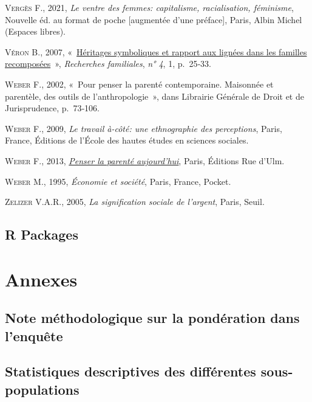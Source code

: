 \documentclass[
  12pt,
]{book}
\newlength{\cslhangindent}
\newenvironment{CSLReferences}[2] %
 {\begin{list}{}{%
  \setlength{\itemindent}{0pt}
  \setlength{\leftmargin}{0pt}
  \setlength{\parsep}{0pt}
  \ifodd #1
   \setlength{\leftmargin}{\cslhangindent}
   \setlength{\itemindent}{-1\cslhangindent}
  \fi
  \setlength{\itemsep}{#2\baselineskip}}}
 {\end{list}}
\begin{document}
\begin{CSLReferences}{0}{1}
\textsc{Vergès F.}, 2021, \emph{Le ventre des femmes: capitalisme,
racialisation, féminisme}, Nouvelle éd. au format de poche {[}augmentée
d'une préface{]}, Paris, Albin Michel (Espaces libres).

\textsc{Véron B.}, 2007,
{«~\href{http://www.cairn.info/revue-recherches-familiales-2007-1-page-25.htm}{Héritages
symboliques et rapport aux lignées dans les familles recomposées}~»},
\emph{Recherches familiales}, \emph{n° 4}, 1, p.~25‑33.

\textsc{Weber F.}, 2002, {«~Pour penser la parenté contemporaine.
Maisonnée et parentèle, des outils de l{'}anthropologie~»}, dans
Librairie Générale de Droit et de Jurisprudence, p.~73‑106.

\textsc{Weber F.}, 2009, \emph{Le travail à-côté: une ethnographie des
perceptions}, Paris, France, Éditions de l'École des hautes études en
sciences sociales.

\textsc{Weber F.}, 2013,
\emph{\href{http://www.cairn.info/penser-la-parente-aujourd-hui--9782728805013.htm}{Penser
la parenté aujourd'hui}}, Paris, Éditions Rue d'Ulm.

\textsc{Weber M.}, 1995, \emph{Économie et société}, Paris, France,
Pocket.

\textsc{Zelizer V.A.R.}, 2005, \emph{La signification sociale de
l'argent}, Paris, Seuil.

\end{CSLReferences}

\section{R Packages}\label{r-packages}

\chapter{Annexes}\label{annexes}

\section{Note méthodologique sur la pondération dans
l'enquête}\label{note-muxe9thodologique-sur-la-ponduxe9ration-dans-lenquuxeate}

\section{Statistiques descriptives des différentes
sous-populations}\label{statistiques-descriptives-des-diffuxe9rentes-sous-populations}
\end{document}
